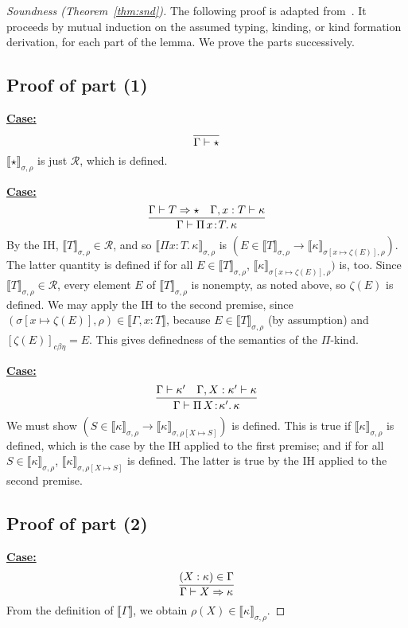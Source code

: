 \documentclass{article}
\newcommand{\choice}[0]{\zeta}
\newcommand{\abs}[4]{{#1}\, #2\! : \! #3.\, #4}
\newcommand{\interp}[1]{\llbracket #1 \rrbracket}
\newcommand{\tpsynth}[0]{\Rightarrow}
\newcommand{\cbe}[0]{c\beta\eta}
\newcommand{\startcase}[1]{\vspace{#1} \noindent\textbf{\underline{Case:}}}
\begin{document}
\begin{proof}[Soundness (Theorem~\ref{thm:snd})]
  The following proof is adapted from~\cite{stump17}.  It proceeds by
  mutual induction on the assumed typing, kinding, or kind formation
  derivation, for each part of the lemma.  We prove the parts
  successively.  

\subsection{Proof of part (1)}

\startcase{.2cm}
\[
\infer{\Gamma \vdash \star }{\ }
\]
$\interp{\star}_{\sigma,\rho}$ is just $\mathcal{R}$, which is
defined.  

\startcase{.2cm}
\[
    \infer{\Gamma\vdash\abs{\Pi}{x}{T}{\kappa}}{\Gamma \vdash T \tpsynth \star & \Gamma,x:T\vdash\kappa} 
\]
By the IH, $\interp{T}_{\sigma,\rho}\in\mathcal{R}$, and so
$\interp{\Pi x : T.\, \kappa}_{\sigma,\rho}$ is
$(E\in\interp{T}_{\sigma,\rho} \to \interp{\kappa}_{\sigma[x\mapsto  \choice(E)],\rho})$.
The latter quantity is defined if for all
$E\in\interp{T}_{\sigma,\rho}$, $\interp{\kappa}_{\sigma[x\mapsto \choice(E)],\rho})$ is, too.  Since
$\interp{T}_{\sigma,\rho}\in\mathcal{R}$, every element $E$ of
$\interp{T}_{\sigma,\rho}$ is nonempty, as noted above, 
so $\choice(E)$ is defined.  We may apply the IH to the second
premise, since
$(\sigma[x\mapsto\choice(E)],\rho)\in\interp{\Gamma,x:T}$, because $E\in\interp{T}_{\sigma,\rho}$ (by assumption)
and $[\choice(E)]_{\cbe} = E$.  This gives definedness of the semantics
of the $\Pi$-kind.

\startcase{.2cm}
\[
   \infer{\Gamma\vdash\abs{\Pi}{X}{\kappa'}{\kappa}}{\Gamma \vdash \kappa' & \Gamma,X:\kappa'\vdash\kappa}
\]
We must show $(S\in\interp{\kappa}_{\sigma,\rho} \to \interp{\kappa}_{\sigma,\rho[X\mapsto S]})$ is defined.
This is true if $\interp{\kappa}_{\sigma,\rho}$ is defined, which is the case by
the IH applied to the first premise; and if for all
$S\in\interp{\kappa}_{\sigma,\rho}$,
$\interp{\kappa}_{\sigma,\rho[X\mapsto S]}$ is defined.  The latter is
true by the IH applied to the second premise.  

\subsection{Proof of part (2)}

\startcase{.2cm}
\[
\infer{\Gamma \vdash X \tpsynth \kappa}{(X : \kappa) \in \Gamma} 
\]
From the definition of $\interp{\Gamma}$, we obtain
$\rho(X)\in\interp{\kappa}_{\sigma,\rho}$.


\end{proof}
\end{document}
